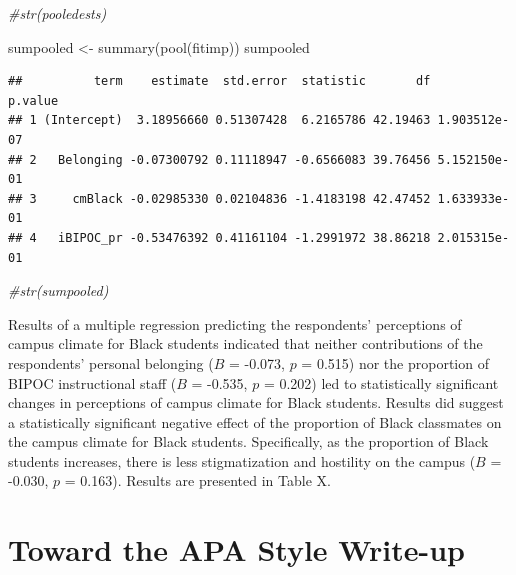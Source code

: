 \documentclass[
  11pt,
]{book}
\newenvironment{Shaded}{\begin{snugshade}}{\end{snugshade}}
\newcommand{\CommentTok}[1]{\textcolor[rgb]{0.56,0.35,0.01}{\textit{#1}}}
\newcommand{\FunctionTok}[1]{\textcolor[rgb]{0.00,0.00,0.00}{#1}}
\newcommand{\NormalTok}[1]{#1}
\newcommand{\OtherTok}[1]{\textcolor[rgb]{0.56,0.35,0.01}{#1}}
\begin{document}
\begin{Shaded}
\begin{Highlighting}[]
\CommentTok{\#str(pooledests)}
\end{Highlighting}
\end{Shaded}

\begin{Shaded}
\begin{Highlighting}[]
\NormalTok{sumpooled }\OtherTok{\textless{}{-}} \FunctionTok{summary}\NormalTok{(}\FunctionTok{pool}\NormalTok{(fitimp))}
\NormalTok{sumpooled}
\end{Highlighting}
\end{Shaded}

\begin{verbatim}
##          term    estimate  std.error  statistic       df      p.value
## 1 (Intercept)  3.18956660 0.51307428  6.2165786 42.19463 1.903512e-07
## 2   Belonging -0.07300792 0.11118947 -0.6566083 39.76456 5.152150e-01
## 3     cmBlack -0.02985330 0.02104836 -1.4183198 42.47452 1.633933e-01
## 4   iBIPOC_pr -0.53476392 0.41161104 -1.2991972 38.86218 2.015315e-01
\end{verbatim}

\begin{Shaded}
\begin{Highlighting}[]
\CommentTok{\#str(sumpooled)}
\end{Highlighting}
\end{Shaded}

Results of a multiple regression predicting the respondents' perceptions of campus climate for Black students indicated that neither contributions of the respondents' personal belonging (\(B\) = -0.073, \(p\) = 0.515) nor the proportion of BIPOC instructional staff (\(B\) = -0.535, \(p\) = 0.202) led to statistically significant changes in perceptions of campus climate for Black students. Results did suggest a statistically significant negative effect of the proportion of Black classmates on the campus climate for Black students. Specifically, as the proportion of Black students increases, there is less stigmatization and hostility on the campus (\(B\) = -0.030, \(p\) = 0.163). Results are presented in Table X.

\hypertarget{toward-the-apa-style-write-up-1}{%
\section{Toward the APA Style Write-up}\label{toward-the-apa-style-write-up-1}}
\end{document}
